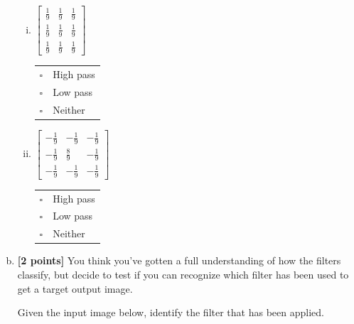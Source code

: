 \begin{enumerate}[(a)]
\begin{enumerate}[(i)]
\item
 $\begin{bmatrix}
    \frac{1}{9} & \frac{1}{9} & \frac{1}{9} \\
    \frac{1}{9} & \frac{1}{9} & \frac{1}{9} \\
    \frac{1}{9} & \frac{1}{9} & \frac{1}{9}
 \end{bmatrix}$
\begin{tabular}[h]{ll}
$\square$ & High pass \\
$\square$ & Low pass \\
$\square$ & Neither \\
\end{tabular}

\item
$\begin{bmatrix}
    -\frac{1}{9} & -\frac{1}{9} & -\frac{1}{9} \\
    -\frac{1}{9} & \frac{8}{9} & -\frac{1}{9} \\
    -\frac{1}{9} & -\frac{1}{9} & -\frac{1}{9}
  \end{bmatrix}$
\begin{tabular}[h]{ll}
$\square$ & High pass \\
$\square$ & Low pass \\
$\square$ & Neither \\
\end{tabular}
\end{enumerate}

\item \textbf{[2 points]}
You think you've gotten a full understanding of how the filters classify, but decide to test if you can recognize which filter has been used to get a target output image. 

Given the input image below, identify the filter that has been applied.



\end{enumerate}
